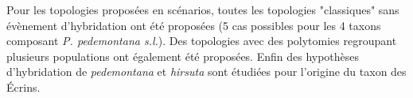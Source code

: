 Pour les topologies proposées en scénarios, toutes les topologies "classiques" sans évènement d'hybridation ont été proposées (5 cas possibles pour les 4 taxons composant  \textit{P. pedemontana s.l.}).
 Des topologies avec des polytomies regroupant plusieurs populations ont également été proposées.
 Enfin des hypothèses d'hybridation de \textit{pedemontana} et \textit{hirsuta} sont étudiées pour l'origine du taxon des Écrins.
